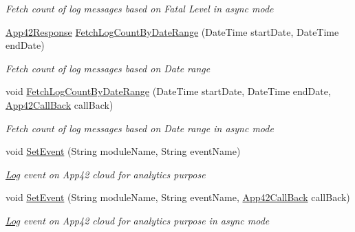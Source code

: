 \begin{DoxyCompactItemize}
\begin{DoxyCompactList}\small\item\em Fetch count of log messages based on Fatal Level in async mode \end{DoxyCompactList}\item 
\hyperlink{classcom_1_1shephertz_1_1app42_1_1paas_1_1sdk_1_1csharp_1_1_app42_response}{App42\+Response} \hyperlink{classcom_1_1shephertz_1_1app42_1_1paas_1_1sdk_1_1csharp_1_1log_1_1_log_service_a5aa03ccf6c1ec470c460499481e98fda}{Fetch\+Log\+Count\+By\+Date\+Range} (Date\+Time start\+Date, Date\+Time end\+Date)
\begin{DoxyCompactList}\small\item\em Fetch count of log messages based on Date range \end{DoxyCompactList}\item 
void \hyperlink{classcom_1_1shephertz_1_1app42_1_1paas_1_1sdk_1_1csharp_1_1log_1_1_log_service_a326f1afc49cb746524197198c5c8a236}{Fetch\+Log\+Count\+By\+Date\+Range} (Date\+Time start\+Date, Date\+Time end\+Date, \hyperlink{interfacecom_1_1shephertz_1_1app42_1_1paas_1_1sdk_1_1csharp_1_1_app42_call_back}{App42\+Call\+Back} call\+Back)
\begin{DoxyCompactList}\small\item\em Fetch count of log messages based on Date range in async mode \end{DoxyCompactList}\item 
void \hyperlink{classcom_1_1shephertz_1_1app42_1_1paas_1_1sdk_1_1csharp_1_1log_1_1_log_service_a0ec4cb6f7e06a3891fb554d7c76091e3}{Set\+Event} (String module\+Name, String event\+Name)
\begin{DoxyCompactList}\small\item\em \hyperlink{classcom_1_1shephertz_1_1app42_1_1paas_1_1sdk_1_1csharp_1_1log_1_1_log}{Log} event on App42 cloud for analytics purpose \end{DoxyCompactList}\item 
void \hyperlink{classcom_1_1shephertz_1_1app42_1_1paas_1_1sdk_1_1csharp_1_1log_1_1_log_service_a6ceaefab6cb0b29458b33a89096e9704}{Set\+Event} (String module\+Name, String event\+Name, \hyperlink{interfacecom_1_1shephertz_1_1app42_1_1paas_1_1sdk_1_1csharp_1_1_app42_call_back}{App42\+Call\+Back} call\+Back)
\begin{DoxyCompactList}\small\item\em \hyperlink{classcom_1_1shephertz_1_1app42_1_1paas_1_1sdk_1_1csharp_1_1log_1_1_log}{Log} event on App42 cloud for analytics purpose in async mode \end{DoxyCompactList}\item 

\end{DoxyCompactItemize}
